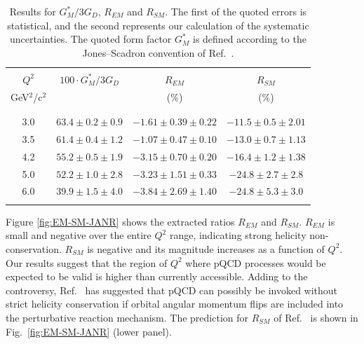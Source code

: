 \documentclass[aps,prl,twocolumn,superscriptaddress]{revtex4}
\begin{document}
\begin{table}[b]
{\scriptsize
 \begin{center}
  \begin{tabular}{c | c | c | c}        
    \hline\hline
                    &                        &          &           \\
    $Q^2$           & $100 \cdot G_M^*/3G_D$ & $R_{EM}$ &  $R_{SM}$ \\
     GeV$^2$/c$^2$  &                        &  ($\%$)  &   ($\%$)  \\
                    &                        &          &           \\
    \hline\hline
          &                          &                             &                             \\
     3.0  &  $ 63.4\pm 0.2  \pm 0.9$ & $ -1.61  \pm 0.39 \pm 0.22$ &  $-11.5 \pm 0.5  \pm 2.01 $ \\
     3.5  &  $ 61.4\pm 0.4  \pm 1.2$ & $ -1.07  \pm 0.47 \pm 0.10$ &  $-13.0 \pm 0.7  \pm 1.13 $ \\
     4.2  &  $ 55.2\pm 0.5  \pm 1.9$ & $ -3.15  \pm 0.70 \pm 0.20$ &  $-16.4 \pm 1.2  \pm 1.38 $ \\
     5.0  &  $ 52.2\pm 1.0  \pm 2.8$ & $ -3.23  \pm 1.51 \pm 0.33$ &  $-24.8 \pm 2.7  \pm 2.8 $  \\
     6.0  &  $ 39.9\pm 1.5  \pm 4.0$ & $ -3.84  \pm 2.69 \pm 1.40$ &  $-24.8 \pm 5.3  \pm 3.0 $  \\
          &                          &                             &                             \\
    \hline
  \end{tabular}
 \end{center}
 \caption{ Results for $G_M^*/3G_D$, $R_{EM}$ and $R_{SM}$. The first of 
           the quoted errors is statistical, and the second represents our 
           calculation of the systematic uncertainties. The quoted form 
           factor $G_M^*$ is defined according to the Jones--Scadron 
           convention of Ref.~\cite{bib:Jones-Scadron}. 
}
 \label{tab:result_ratio}
}
\end{table}


Figure \ref{fig:EM-SM-JANR}  shows the extracted  ratios $R_{EM}$ and 
$R_{SM}$. $R_{EM}$ is small and negative over the entire $Q^2$ range,
indicating strong helicity non-conservation.
$R_{SM}$ is negative and its magnitude increases as a function of $Q^2$.
Our results suggest that the region of $Q^2$ where pQCD processes would be 
expected to be valid is  higher than currently accessible. Adding to the 
controversy, Ref.~\cite{bib:Ji-pqcd} has suggested that pQCD can possibly be 
invoked without strict helicity conservation if orbital angular momentum
flips are included into the perturbative reaction mechanism. The prediction 
for $R_{SM}$ of  Ref.~\cite{bib:Ji-pqcd} is shown in 
Fig.~\ref{fig:EM-SM-JANR} (lower panel).
\end{document}
